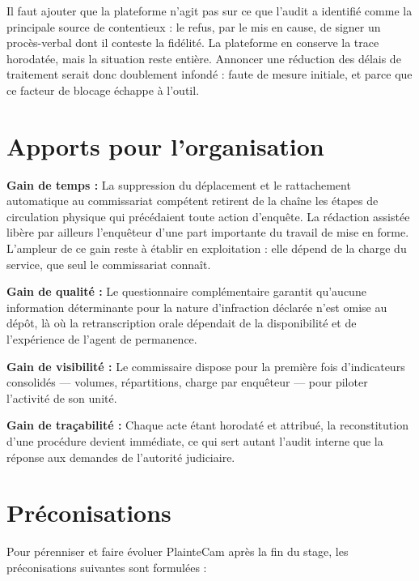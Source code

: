 Il faut ajouter que la plateforme n'agit pas sur ce que l'audit a identifié comme la principale source de contentieux : le refus, par le mis en cause, de signer un procès-verbal dont il conteste la fidélité. La plateforme en conserve la trace horodatée, mais la situation reste entière. Annoncer une réduction des délais de traitement serait donc doublement infondé : faute de mesure initiale, et parce que ce facteur de blocage échappe à l'outil.

\section{Apports pour l'organisation}

\textbf{Gain de temps :} La suppression du déplacement et le rattachement automatique au commissariat compétent retirent de la chaîne les étapes de circulation physique qui précédaient toute action d'enquête. La rédaction assistée libère par ailleurs l'enquêteur d'une part importante du travail de mise en forme. L'ampleur de ce gain reste à établir en exploitation : elle dépend de la charge du service, que seul le commissariat connaît.

\textbf{Gain de qualité :} Le questionnaire complémentaire garantit qu'aucune information déterminante pour la nature d'infraction déclarée n'est omise au dépôt, là où la retranscription orale dépendait de la disponibilité et de l'expérience de l'agent de permanence.

\textbf{Gain de visibilité :} Le commissaire dispose pour la première fois d'indicateurs consolidés — volumes, répartitions, charge par enquêteur — pour piloter l'activité de son unité.

\textbf{Gain de traçabilité :} Chaque acte étant horodaté et attribué, la reconstitution d'une procédure devient immédiate, ce qui sert autant l'audit interne que la réponse aux demandes de l'autorité judiciaire.

\section{Préconisations}

Pour pérenniser et faire évoluer PlainteCam après la fin du stage, les préconisations suivantes sont formulées :

